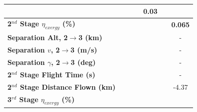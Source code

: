 \begin{table}[ht]
\begin{tabular}{l c c c c c c}
		& \firstsecondSeparationgammamThreeStandardNoReturn
		& \firstsecondSeparationgammamThreeOneHundredFiveNoReturn
		& \firstsecondSeparationgammamThreeOneHundredTenNoReturn
		&0.03
		\\
		\hline 
		\textbf{2$^{nd}$ Stage $\eta_{exergy}$ (\%)}
		& \textbf{\secondExergyEffmThreeNinetyNoReturn}
		& \textbf{\secondExergyEffmThreeNinetyFiveNoReturn}
		& \textbf{\secondExergyEffmThreeStandardNoReturn}
		& \textbf{\secondExergyEffmThreeOneHundredFiveNoReturn}
		& \textbf{\secondExergyEffmThreeOneHundredTenNoReturn}
		& \textbf{0.065}
		\\
		\textbf{Separation Alt, 2$\rightarrow$3 (km)}
		& \secondthirdSeparationAltmThreeNinetyNoReturn
		& \secondthirdSeparationAltmThreeNinetyFiveNoReturn
		& \secondthirdSeparationAltmThreeStandardNoReturn
		& \secondthirdSeparationAltmThreeOneHundredFiveNoReturn
		& \secondthirdSeparationAltmThreeOneHundredTenNoReturn
		& -
		\\
		\textbf{Separation $v$, 2$\rightarrow$3 (m/s)}
		& \secondthirdSeparationvmThreeNinetyNoReturn
		& \secondthirdSeparationvmThreeNinetyFiveNoReturn
		& \secondthirdSeparationvmThreeStandardNoReturn
		& \secondthirdSeparationvmThreeOneHundredFiveNoReturn
		& \secondthirdSeparationvmThreeOneHundredTenNoReturn
		& -
		\\
		\textbf{Separation $\gamma$, 2$\rightarrow$3 (deg)}
		& \secondthirdSeparationgammamThreeNinetyNoReturn
		& \secondthirdSeparationgammamThreeNinetyFiveNoReturn
		& \secondthirdSeparationgammamThreeStandardNoReturn
		& \secondthirdSeparationgammamThreeOneHundredFiveNoReturn
		& \secondthirdSeparationgammamThreeOneHundredTenNoReturn
		& -
		\\
		\textbf{2$^{nd}$ Stage Flight Time (s)}
		& \secondFlightTimemThreeNinetyNoReturn
		& \secondFlightTimemThreeNinetyFiveNoReturn
		& \secondFlightTimemThreeStandardNoReturn
		& \secondFlightTimemThreeOneHundredFiveNoReturn
		& \secondFlightTimemThreeOneHundredTenNoReturn
		& -
		\\
		\textbf{2$^{nd}$ Stage Distance Flown (km)}
		& \SecondDistmThreeNinetyNoReturn
		& \SecondDistmThreeNinetyFiveNoReturn
		& \SecondDistmThreeStandardNoReturn
		& \SecondDistmThreeOneHundredFiveNoReturn
		& \SecondDistmThreeOneHundredTenNoReturn
		&-4.37
		\\
		\hline 
		\textbf{3$^{rd}$ Stage $\eta_{exergy}$ (\%)}
		& \textbf{\thirddExergyEffmThreeNinetyNoReturn}
		& \textbf{\thirddExergyEffmThreeNinetyFiveNoReturn}
		& \textbf{\thirddExergyEffmThreeStandardNoReturn}
		& \textbf{\thirddExergyEffmThreeOneHundredFiveNoReturn}

\end{tabular}
\end{table}
